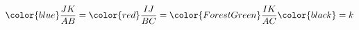 \documentclass[main.tex]{subfiles}
\begin{document}
\begin{enumerate}
	
	$$	{\color{blue} \frac{JK}{AB} } = {\color{red} \frac{IJ}{BC} } = {\color{ForestGreen} \frac{IK}{AC} } \color{black} =k 	$$
	
	
\end{enumerate}  
%	 
\end{document}
